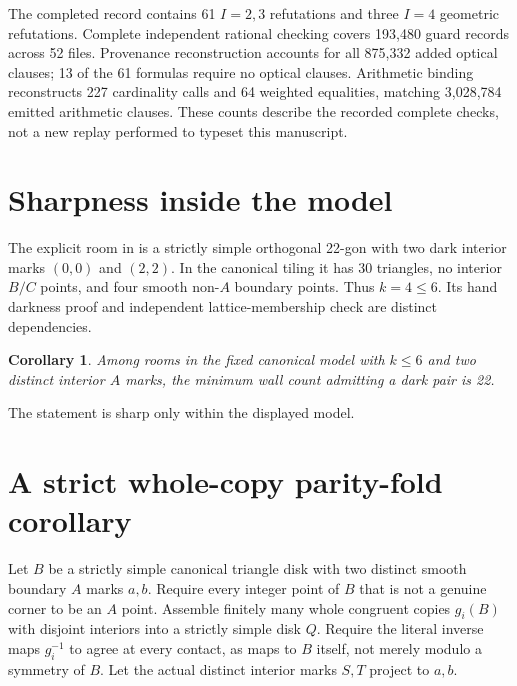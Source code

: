 \documentclass[11pt]{article}
\newtheorem{corollary}[theorem]{Corollary}
\theoremstyle{definition}
\begin{document}
The completed record contains 61 $I=2,3$ refutations and three $I=4$ geometric refutations. Complete independent rational checking covers 193,480 guard records across 52 files. Provenance reconstruction accounts for all 875,332 added optical clauses; 13 of the 61 formulas require no optical clauses. Arithmetic binding reconstructs 227 cardinality calls and 64 weighted equalities, matching 3,028,784 emitted arithmetic clauses. These counts describe the recorded complete checks, not a new replay performed to typeset this manuscript.

\section{Sharpness inside the model}
The explicit room in \cite{construction} is a strictly simple orthogonal 22-gon with two dark interior marks $(0,0)$ and $(2,2)$. In the canonical tiling it has 30 triangles, no interior $B/C$ points, and four smooth non-$A$ boundary points. Thus $k=4\le6$. Its hand darkness proof and independent lattice-membership check are distinct dependencies.

\begin{corollary}
Among rooms in the fixed canonical model with $k\le6$ and two distinct interior $A$ marks, the minimum wall count admitting a dark pair is 22.
\end{corollary}
The statement is sharp only within the displayed model.

\section{A strict whole-copy parity-fold corollary}
Let $B$ be a strictly simple canonical triangle disk with two distinct smooth boundary $A$ marks $a,b$. Require every integer point of $B$ that is not a genuine corner to be an $A$ point. Assemble finitely many whole congruent copies $g_i(B)$ with disjoint interiors into a strictly simple disk $Q$. Require the literal inverse maps $g_i^{-1}$ to agree at every contact, as maps to $B$ itself, not merely modulo a symmetry of $B$. Let the actual distinct interior marks $S,T$ project to $a,b$.
\end{document}
